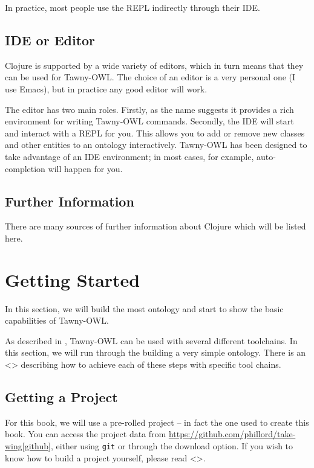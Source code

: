 In practice, most people use the REPL indirectly through their IDE.

\subsection{IDE or Editor}
\label{sec-3-5}

Clojure is supported by a wide variety of editors, which in turn means
that they can be used for Tawny-OWL. The choice of an editor is a very
personal one (I use Emacs), but in practice any good editor will work.

The editor has two main roles. Firstly, as the name suggests it provides
a rich environment for writing Tawny-OWL commands. Secondly, the IDE
will start and interact with a REPL for you. This allows you to add or
remove new classes and other entities to an ontology interactively.
Tawny-OWL has been designed to take advantage of an IDE environment; in
most cases, for example, auto-completion will happen for you.

\subsection{Further Information}
\label{sec-3-6}

There are many sources of further information about Clojure which will
be listed here.



\section{Getting Started}
\label{sec-4}

In this section, we will build the most ontology and start to show the
basic capabilities of Tawny-OWL.

As described in \label{/the/environment-the-environment}, Tawny-OWL can be
used with several different toolchains. In this section, we will run
through the building a very simple ontology. There is an <> describing
how to achieve each of these steps with specific tool chains.

\subsection{Getting a Project}
\label{sec-4-1}

For this book, we will use a pre-rolled project -- in fact the one used
to create this book. You can access the project data from
\url{https://github.com/phillord/take-wing[github}], either using \texttt{git} or
through the download option. If you wish to know how to build a project
yourself, please read <>.

